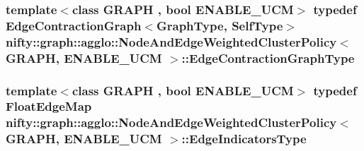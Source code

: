 \subsubsection[{Edge\+Contraction\+Graph\+Type}]{\setlength{\rightskip}{0pt plus 5cm}template$<$class G\+R\+A\+P\+H , bool E\+N\+A\+B\+L\+E\+\_\+\+U\+C\+M$>$ typedef {\bf Edge\+Contraction\+Graph}$<${\bf Graph\+Type}, {\bf Self\+Type}$>$ {\bf nifty\+::graph\+::agglo\+::\+Node\+And\+Edge\+Weighted\+Cluster\+Policy}$<$ G\+R\+A\+P\+H, E\+N\+A\+B\+L\+E\+\_\+\+U\+C\+M $>$\+::{\bf Edge\+Contraction\+Graph\+Type}}\label{classnifty_1_1graph_1_1agglo_1_1NodeAndEdgeWeightedClusterPolicy_a467e2768e424a998379deedaaebfe9a9}
\hypertarget{classnifty_1_1graph_1_1agglo_1_1NodeAndEdgeWeightedClusterPolicy_a708c515ae905c01d71d590976fb06ebb}{}
\subsubsection[{Edge\+Indicators\+Type}]{\setlength{\rightskip}{0pt plus 5cm}template$<$class G\+R\+A\+P\+H , bool E\+N\+A\+B\+L\+E\+\_\+\+U\+C\+M$>$ typedef {\bf Float\+Edge\+Map} {\bf nifty\+::graph\+::agglo\+::\+Node\+And\+Edge\+Weighted\+Cluster\+Policy}$<$ G\+R\+A\+P\+H, E\+N\+A\+B\+L\+E\+\_\+\+U\+C\+M $>$\+::{\bf Edge\+Indicators\+Type}}\label{classnifty_1_1graph_1_1agglo_1_1NodeAndEdgeWeightedClusterPolicy_a708c515ae905c01d71d590976fb06ebb}
\hypertarget{classnifty_1_1graph_1_1agglo_1_1NodeAndEdgeWeightedClusterPolicy_a3026f9b9f7061857a7d6c833c1b2fafb}{}
